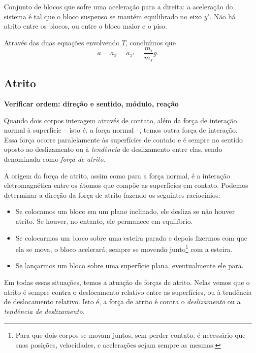 \begin{marginfigure}[-10cm]
\caption{Conjunto de blocos que sofre uma aceleração para a direita: a aceleração do sistema é tal que o bloco suspenso se mantém equilibrado no eixo $y'$. Não há atrito entre os blocos, ou entre o bloco maior e o piso. \label{Fig:BlocoSuspensoAcelerado}}
\end{marginfigure}

\noindent{}Através das duas equações envolvendo $T$, concluímos que
\begin{equation}
    a = a_x = a_{x'}= \frac{m_i}{m_s} g.
\end{equation}
\subsection{Atrito}

\textbf{Verificar ordem: direção e sentido, módulo, reação}

Quando dois corpos interagem através de contato, além da força de interação normal à superfície -- isto é, a força normal --, temos outra força de interação. Essa força ocorre paralelamente às superfícies de contato e é sempre no sentido oposto ao deslizamento ou à \emph{tendência} de deslizamento entre elas, sendo denominada como \emph{força de atrito}.

A origem da força de atrito, assim como para a força normal, é a interação eletromagnética entre os átomos que compõe as superfícies em contato. Podemos determinar a direção da força de atrito fazendo os seguintes raciocínios:
\begin{itemize}
    \item Se colocamos um bloco em um plano inclinado, ele desliza se não houver atrito. Se houver, no entanto, ele permanece em equilíbrio.
    \item Se colocarmos um bloco sobre uma esteira parada e depois fizermos com que ela se mova, o bloco acelerará, sempre se movendo junto\footnote{Para que dois corpos se movam juntos, sem perder contato, é necessário que suas posições, velocidades, e acelerações sejam sempre as mesmas.} com a esteira.
    \item Se lançarmos um bloco sobre uma superfície plana, eventualmente ele para.
\end{itemize}
%
Em todas essas situações, temos a atuação de forças de atrito. Nelas vemos que o atrito é sempre contra o deslocamento relativo entre as superfícies, ou à tendência de deslocamento relativo. Isto é, a força de atrito é contra o \emph{deslizamento} ou a \emph{tendência de deslizamento}.

